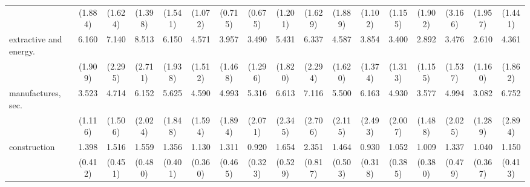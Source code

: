 {\begin{tabular}{l*{16}{c}}
                    &     (1.884)         &     (1.624)         &     (1.398)         &     (1.541)         &     (1.072)         &     (0.715)         &     (0.675)         &     (1.201)         &     (1.629)         &     (1.889)         &     (1.102)         &     (1.155)         &     (1.902)         &     (3.166)         &     (1.957)         &     (1.441)         \\
[1em]
extractive and energy.&       6.160\sym{***}&       7.140\sym{***}&       8.513\sym{***}&       6.150\sym{***}&       4.571\sym{***}&       3.957\sym{***}&       3.490\sym{***}&       5.431\sym{***}&       6.337\sym{***}&       4.587\sym{***}&       3.854\sym{***}&       3.400\sym{**} &       2.892\sym{**} &       3.476\sym{**} &       2.610\sym{*}  &       4.361\sym{***}\\
                    &     (1.909)         &     (2.295)         &     (2.711)         &     (1.938)         &     (1.512)         &     (1.468)         &     (1.296)         &     (1.820)         &     (2.294)         &     (1.620)         &     (1.374)         &     (1.313)         &     (1.155)         &     (1.537)         &     (1.160)         &     (1.862)         \\
[1em]
manufactures, sec.  &       3.523\sym{***}&       4.714\sym{***}&       6.152\sym{***}&       5.625\sym{***}&       4.590\sym{***}&       4.993\sym{***}&       5.316\sym{***}&       6.613\sym{***}&       7.116\sym{***}&       5.500\sym{***}&       6.163\sym{***}&       4.930\sym{***}&       3.577\sym{**} &       4.994\sym{***}&       3.082\sym{**} &       6.752\sym{***}\\
                    &     (1.116)         &     (1.506)         &     (2.024)         &     (1.848)         &     (1.594)         &     (1.894)         &     (2.071)         &     (2.345)         &     (2.706)         &     (2.115)         &     (2.493)         &     (2.007)         &     (1.488)         &     (2.025)         &     (1.289)         &     (2.894)         \\
[1em]
construction        &       1.398         &       1.516         &       1.559         &       1.356         &       1.130         &       1.311         &       0.920         &       1.654         &       2.351\sym{*}  &       1.464         &       0.930         &       1.052         &       1.009         &       1.337         &       1.040         &       1.150         \\
                    &     (0.412)         &     (0.451)         &     (0.480)         &     (0.401)         &     (0.360)         &     (0.465)         &     (0.323)         &     (0.529)         &     (0.817)         &     (0.503)         &     (0.318)         &     (0.385)         &     (0.380)         &     (0.479)         &     (0.367)         &     (0.413)         \\

\end{tabular}}
